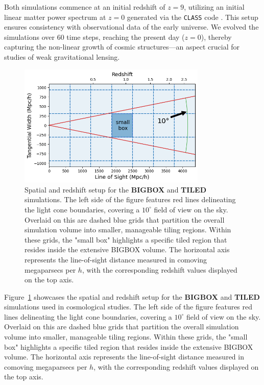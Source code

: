 Both simulations commence at an initial redshift of $z = 9$, utilizing an initial linear matter power spectrum at $z = 0$ generated via the \texttt{CLASS} code \citep{2011JCAP...07..034B}. This setup ensures consistency with observational data of the early universe. We evolved the simulations over 60 time steps, reaching the present day ($z = 0$), thereby capturing the non-linear growth of cosmic structures—an aspect crucial for studies of weak gravitational lensing.

\begin{figure}[ht]
    \centering
    \includegraphics[width=0.8\textwidth]{figures/light_cone_configuration.png}
    \caption{Spatial and redshift setup for the \textbf{BIGBOX} and \textbf{TILED} simulations. The left side of the figure features red lines delineating the light cone boundaries, covering a $10^\circ$ field of view on the sky. Overlaid on this are dashed blue grids that partition the overall simulation volume into smaller, manageable tiling regions. Within these grids, the "small box" highlights a specific tiled region that resides inside the extensive BIGBOX volume. The horizontal axis represents the line-of-sight distance measured in comoving megaparsecs per $h$, with the corresponding redshift values displayed on the top axis.} \label{fig:simulationsetting}
\end{figure}
Figure~\ref{fig:simulationsetting} showcases the spatial and redshift setup for the \textbf{BIGBOX} and \textbf{TILED} simulations used in cosmological studies. The left side of the figure features red lines delineating the light cone boundaries, covering a $10^\circ$ field of view on the sky. Overlaid on this are dashed blue grids that partition the overall simulation volume into smaller, manageable tiling regions. Within these grids, the "small box" highlights a specific tiled region that resides inside the extensive BIGBOX volume. The horizontal axis represents the line-of-sight distance measured in comoving megaparsecs per $h$, with the corresponding redshift values displayed on the top axis. 

